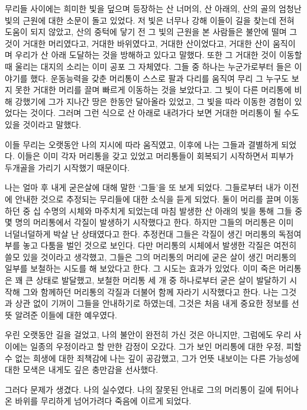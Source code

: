 무리들 사이에는 희미한 빛을 덮으며 등장하는 산 너머의, 산 아래의, 산의 골의 엄청난 빛의 근원에 대한 소문이 돌고 있었다. 저 빛은 너무나 강해 이들이 길을 찾는데 전혀 도움이 되지 않았고, 산의 중턱에 닿기 전 그 빛의 근원을 본 사람들은 불안에 떨며 그것이 거대한 머리였다고, 거대한 바위였다고, 거대한 산이었다고, 거대한 산이 움직이며 우리가 산 아래 도달하는 것을 방해하고 있다고 말했다. 또한 그 거대한 것이 이동할 때 울리는 대지의 소리는 이미 공포 그 자체였다. 그들 중 하나는 누군가로부터 들은 이야기를 했다. 운동능력을 갖춘 머리통이 스스로 팔과 다리를 움직여 무리 그 누구도 보지 못한 거대한 머리를 끌며 빠르게 이동하는 것을 보았다고. 그 빛이 다른 머리통에 비해 강했기에 그가 지나간 땅은 한동안 달아올라 있었고, 그 빛을 따라 이동한 경험이 있었다는 것이다. 그러며 그런 식으로 산 아래로 내려가다 보면 거대한 머리통이 될 수도 있을 것이라고 말했다.



이들 무리는 오랫동안 나의 지시에 따라 움직였고, 이후에 나는 그들과 결별하게 되었다. 이들은 이미 각자 머리통을 갖고 있었고 머리통들이 회복되기 시작하면서 피부가 두개골을 가리기 시작했기 때문이다.



나는 얼마 후 내게 굳은살에 대해 말한 `그들'을 또 보게 되었다. 그들로부터 내가 이전에 안내한 것으로 추정되는 무리들에 대한 소식을 듣게 되었다. 둘이 머리를 끌며 이동하던 중 십 수명의 시체와 마주치게 되었는데 마침 발생한 산 아래의 빛을 통해 그들 중 몇 명의 머리통에서 각질이 발생하기 시작했다고 한다. 하지만 그들의 머리통은 이미 너덜너덜하게 박살 난 상태였다고 한다. 추정컨대 그들은 각질이 생긴 머리통의 독점여부를 놓고 다툼을 벌인 것으로 보인다. 다만 머리통의 시체에서 발생한 각질은 여전히 쓸모 있을 것이라고 생각했고, 그들은 그의 머리통의 머리에 굳은 살이 생긴 머리통의 일부를 보철하는 시도를 해 보았다고 한다. 그 시도는 효과가 있었다. 이미 죽은 머리통은 꽤 큰 상태로 발달했고, 보철한 머리통 세 개 중 하나로부터 굳은 살이 발달하기 시작해 그와 함께하던 머리통의 각질과 더불어 함께 자라기 시작했다고 한다. 나는 그것과 상관 없이 기꺼이 그들을 안내하기로 하였는데, 그것은 처음 내게 중요한 정보를 선뜻 알려준 이들에 대한 예우였다.



우린 오랫동안 길을 걸었고, 나의 불안이 완전히 가신 것은 아니지만, 그럼에도 우리 사이에는 일종의 우정이라고 할 만한 감정이 오갔다. 그가 보인 머리통에 대한 우정, 피할 수 없는 희생에 대한 죄책감에 나는 깊이 공감했고, 그가 언뜻 내보이는 다른 가능성에 대한 모색은 내게도 깊은 충만감을 선사했다.



그러다 문제가 생겼다. 나의 실수였다. 나의 잘못된 안내로 그의 머리통이 길에 튀어나온 바위를 무리하게 넘어가려다 죽음에 이르게 되었다.



